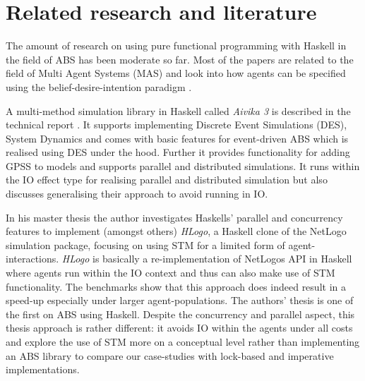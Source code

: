 \section{Related research and literature}
\label{sec:literature}

The amount of research on using pure functional programming with Haskell in the field of ABS has been moderate so far. Most of the papers are related to the field of Multi Agent Systems (MAS) and look into how agents can be specified using the belief-desire-intention paradigm \cite{de_jong_suitability_2014,sulzmann_specifying_2007,jankovic_functional_2007}.

A multi-method simulation library in Haskell called \textit{Aivika 3} is described in the technical report \cite{sorokin_aivika_2015}. It supports implementing Discrete Event Simulations (DES), System Dynamics and comes with basic features for event-driven ABS which is realised using DES under the hood. Further it provides functionality for adding GPSS to models and supports parallel and distributed simulations. It runs within the IO effect type for realising parallel and distributed simulation but also discusses generalising their approach to avoid running in IO.

In his master thesis \cite{bezirgiannis_improving_2013} the author investigates Haskells' parallel and concurrency features to implement (amongst others) \textit{HLogo}, a Haskell clone of the NetLogo \cite{wilensky_introduction_2015} simulation package, focusing on using STM for a limited form of agent-interactions. \textit{HLogo} is basically a re-implementation of NetLogos API in Haskell where agents run within the IO context and thus can also make use of STM functionality. The benchmarks show that this approach does indeed result in a speed-up especially under larger agent-populations. The authors' thesis is one of the first on ABS using Haskell. Despite the concurrency and parallel aspect, this thesis approach is rather different: it avoids IO within the agents under all costs and explore the use of STM more on a conceptual level rather than implementing an ABS library to compare our case-studies with lock-based and imperative implementations.

